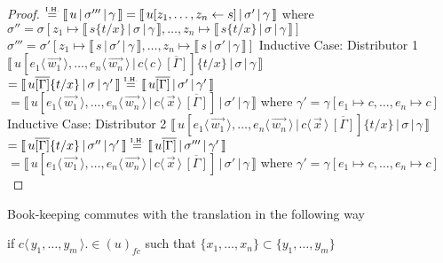\documentclass[a4paper,UKenglish,cleveref, autoref]{lipics-v2019}
\newcommand{\fc}[1]{(#1)_{fc}}
\newcommand{\set}[1]{ \{ #1 \} }
\newcommand{\fake}[3]{#1 \langle \, #2 \, \rangle . #3}
\newcommand{\share}[3]{#1 [#2 \leftarrow #3]}
\newcommand{\dist}[5]{#1 [ #2 \, \vert \, \fakedist{#4}{#5} \, #3 ]}
\newcommand{\fakedist}[2]{#1 \langle \, #2 \, \rangle}
\newcommand{\sub}[3]{#1 \{ #2 / #3 \}}
\newcommand{\readbackwmap}[3]{\llbracket \, #1 \, \vert \, #2 \, \vert \, #3  \, \rrbracket }
\newcommand{\IH}{\stackrel{\hbox{\tiny I.H.}}{\hbox{=}}}
\begin{document}
\begin{proof}
\newline
$\IH \readbackwmap{u}{\sigma'''}{\gamma} = \readbackwmap{\share{u}{z_{1}, \dots, z_{n}}{s}}{\sigma'}{\gamma}$
\newline
where
\newline
$\sigma'' = \sigma [z_{1} \mapsto \readbackwmap{s \sub{}{t}{x}}{\sigma}{\gamma} , \dots , z_{n} \mapsto \readbackwmap{s \sub{}{t}{x}}{\sigma}{\gamma} ]$
\newline
$\sigma''' = \sigma' [z_{1} \mapsto \readbackwmap{s}{\sigma'}{\gamma} , \dots , z_{n} \mapsto \readbackwmap{s }{\sigma'}{\gamma} ]$
\newline
\newline
Inductive Case: Distributor 1
\newline
$\readbackwmap{\dist{u}{\fakedist{e_{1}}{\vec{w_{1}}}, \dots, \fakedist{e_{n}}{\vec{w_{n}}}}{\overline{[\Gamma]}}{c}{c} \sub{}{t}{x}}{\sigma}{\gamma}$
\newline
$= \readbackwmap{u \overline{[\Gamma]} \sub{}{t}{x}}{\sigma}{\gamma'} \IH \readbackwmap{u \overline{[\Gamma]}}{\sigma'}{\gamma'}$
\newline
$= \readbackwmap{\dist{u}{\fakedist{e_{1}}{\vec{w_{1}}}, \dots, \fakedist{e_{n}}{\vec{w_{n}}}}{\overline{[\Gamma]}}{c}{\vec{x}} }{\sigma'}{\gamma}$
\newline
where
\newline
$\gamma' = \gamma [e_{1} \mapsto c, \dots, e_{n} \mapsto c]$
\newline
\newline
Inductive Case: Distributor 2
\newline
$\readbackwmap{\dist{u}{\fakedist{e_{1}}{\vec{w_{1}}}, \dots, \fakedist{e_{n}}{\vec{w_{n}}}}{\overline{[\Gamma]}}{c}{\vec{x}} \sub{}{t}{x}}{\sigma}{\gamma}$
\newline
$= \readbackwmap{u \overline{[\Gamma]} \sub{}{t}{x}}{\sigma''}{\gamma'} \IH \readbackwmap{u \overline{[\Gamma]}}{\sigma'''}{\gamma'}$
\newline
$= \readbackwmap{\dist{u}{\fakedist{e_{1}}{\vec{w_{1}}}, \dots, \fakedist{e_{n}}{\vec{w_{n}}}}{\overline{[\Gamma]}}{c}{\vec{x}} }{\sigma'}{\gamma}$
\newline
where
\newline
$\gamma' = \gamma [e_{1} \mapsto c, \dots, e_{n} \mapsto c]$
\end{proof}

Book-keeping commutes with the translation in the following way

if $\fake{c}{y_{1}, \dots, y_{m}} \in \fc{u}$ such that $\set{x_{1}, \dots, x_{n}} \subset \set{y_{1}, \dots, y_{m}}$
\end{document}
